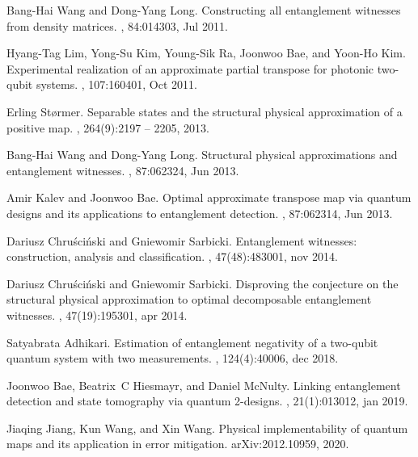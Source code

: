 \documentclass[12pt]{iopart}
\begin{document}
\begin{thebibliography}{10}
Bang-Hai Wang and Dong-Yang Long.
\newblock Constructing all entanglement witnesses from density matrices.
, 84:014303, Jul 2011.

Hyang-Tag Lim, Yong-Su Kim, Young-Sik Ra, Joonwoo Bae, and Yoon-Ho Kim.
\newblock Experimental realization of an approximate partial transpose for
  photonic two-qubit systems.
, 107:160401, Oct 2011.

Erling Størmer.
\newblock Separable states and the structural physical approximation of a
  positive map.
, 264(9):2197 -- 2205, 2013.

Bang-Hai Wang and Dong-Yang Long.
\newblock Structural physical approximations and entanglement witnesses.
, 87:062324, Jun 2013.

Amir Kalev and Joonwoo Bae.
\newblock Optimal approximate transpose map via quantum designs and its
  applications to entanglement detection.
, 87:062314, Jun 2013.

Dariusz Chru{\'{s}}ci{\'{n}}ski and Gniewomir Sarbicki.
\newblock Entanglement witnesses: construction, analysis and classification.
,
  47(48):483001, nov 2014.

Dariusz Chru{\'{s}}ci{\'{n}}ski and Gniewomir Sarbicki.
\newblock Disproving the conjecture on the structural physical approximation to
  optimal decomposable entanglement witnesses.
,
  47(19):195301, apr 2014.

Satyabrata Adhikari.
\newblock Estimation of entanglement negativity of a two-qubit quantum system
  with two measurements.
, 124(4):40006, dec 2018.

Joonwoo Bae, Beatrix~C Hiesmayr, and Daniel McNulty.
\newblock Linking entanglement detection and state tomography via quantum
  2-designs.
, 21(1):013012, jan 2019.

Jiaqing Jiang, Kun Wang, and Xin Wang.
\newblock Physical implementability of quantum maps and its application in
  error mitigation.
\newblock arXiv:2012.10959, 2020.


\end{thebibliography}
\end{document}
